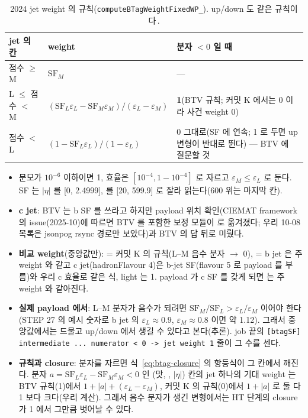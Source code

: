 \begin{table}[htbp]
\caption{2024 jet weight 의 규칙(\texttt{computeBTagWeightFixedWP\_}). up/down 도 같은 규칙이다\,.}
\label{tab:btag-rules}
\centering\small
\begin{tabularx}{\textwidth}{@{}p{2.3cm}p{4.6cm}L@{}}
\toprule
jet 의 칸 & weight & 분자 $<0$ 일 때 \\
\midrule
점수 $\geq$ M & $\mathrm{SF}_M$ & --- \\
L $\leq$ 점수 $<$ M & $(\mathrm{SF}_L\varepsilon_L-\mathrm{SF}_M\varepsilon_M)/(\varepsilon_L-\varepsilon_M)$ & \textbf{1}(BTV 규칙; 커밋 K 에서는 0 이라 사건 weight 0) \\
점수 $<$ L & $(1-\mathrm{SF}_L\varepsilon_L)/(1-\varepsilon_L)$ & 0 그대로(SF 에 연속; 1 로 두면 up 변형이 반대로 뛴다) --- BTV 에 질문할 것 \\
\bottomrule
\end{tabularx}
\end{table}

\begin{itemize}
\item 분모가 $10^{-6}$ 이하이면 1, 효율은 $[10^{-4}, 1-10^{-4}]$ 로 자르고 $\varepsilon_M\leq\varepsilon_L$ 로 둔다. SF 는 $|\eta|$ 를 [0, 2.4999],
  \pt{} 를 [20, 599.9]\GeV{} 로 잘라 읽는다(600\GeV{} 위는 마지막 칸).
\item \textbf{c jet}: BTV 는 b SF 를 쓰라고 하지만 payload 위치 확인(CIEMAT framework 의 issue(2025-10)에 따르면 BTV 를 포함한 보정 모듈이
   로 옮겨졌다; 우리 10-08 목록은 jsonpog rsync 경로만 보았다)과 BTV 의 답 뒤로
  미뤘다\tagopen.
\item \textbf{비교 weight}(중앙값만):  = 커밋 K 의 규칙(L–M 음수 분자 $\to$ 0),  = b jet 은 주
  weight 와 같고 c jet(hadronFlavour 4)은 b-jet SF(flavour 5 로 payload 를 부름)와 우리 c 효율로 같은 식, light 는 1. payload 가 c SF 를 갖게 되면
   는 주 weight 와 같아진다\tagimpl.
\item \textbf{실제 payload 에서}: L–M 분자가 음수가 되려면 $\mathrm{SF}_M/\mathrm{SF}_L > \varepsilon_L/\varepsilon_M$ 이어야 한다(STEP 27 의
  예시 숫자로 b jet 의 $\varepsilon_L\approx0.9$, $\varepsilon_M\approx0.8$ 이면 약 1.12). 그래서 중앙값에서는 드물고 up/down 에서 생길 수 있다고
  본다(추론). job 끝의 \texttt{[btagSF] intermediate ... numerator < 0 -> jet weight 1} 줄이 그
  수를 센다.
\item \textbf{규칙과 closure}: 분자를 자르면 식~\eqref{eq:btag-closure} 의 항등식이 그 칸에서 깨진다. 분자 $a=\mathrm{SF}_L\varepsilon_L-\mathrm{SF}_M\varepsilon_M<0$
  인 (맛, \pt, $|\eta|$) 칸의 jet 하나의 기대 weight 는 BTV 규칙(1)에서 $1+|a|+(\varepsilon_L-\varepsilon_M)$, 커밋 K 의 규칙(0)에서 $1+|a|$ 로 둘 다 1 보다
  크다(우리 계산). 그래서 음수 분자가 생긴 변형에서는 HT 단계의 closure 가 1 에서 그만큼 벗어날 수 있다.
\end{itemize}


